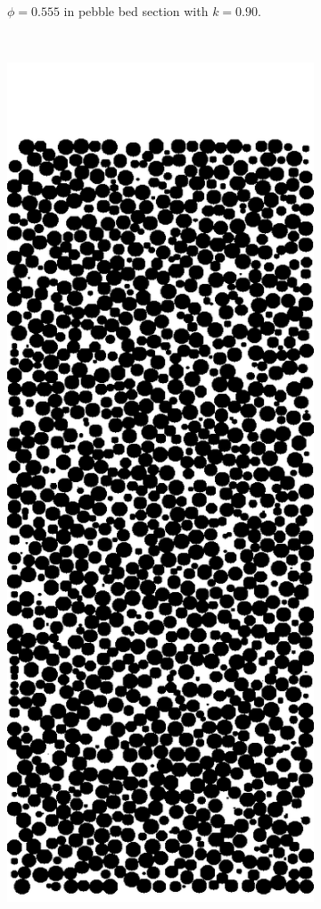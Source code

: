 \begin{figure}[ht]
\begin{subfigure}[b]{0.2\textwidth}
                \caption{$\phi = 0.555$ in pebble bed section with $k = 0.90$.}
                \label{fig:2d-res20-k090}
        \end{subfigure}
        ~
        \begin{subfigure}[b]{0.2\textwidth}
                \includegraphics[width=\textwidth]{figures/lbm/2d-res20-k100.png}

\end{subfigure}
\end{figure}
